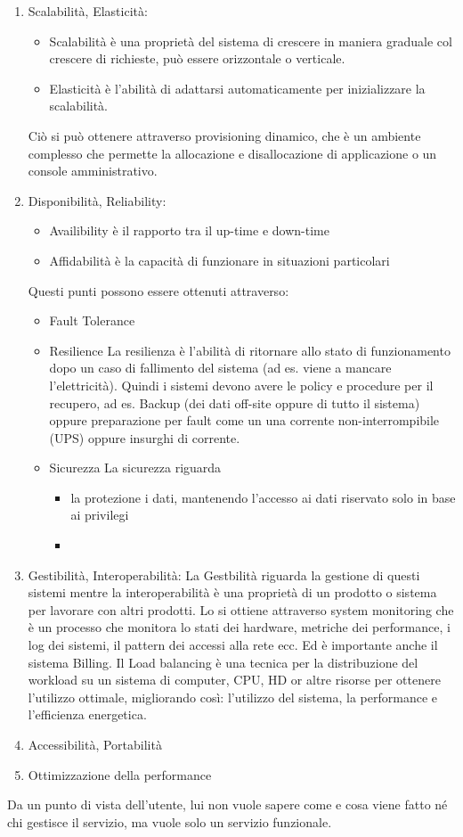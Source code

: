 \documentclass[11pt, twocolumn]{article}
\newenvironment{myitemize}
{ \begin{itemize}
		\setlength{\itemsep}{0pt}
		\setlength{\parskip}{0pt}
		\setlength{\parsep}{0pt}     }
	{ \end{itemize}                  }
\newenvironment{myenumerate}
{ \begin{enumerate}
		\setlength{\itemsep}{0pt}
		\setlength{\parskip}{0pt}
		\setlength{\parsep}{0pt}     }
	{ \end{enumerate}                  }
\begin{document}
\begin{myenumerate}
	\item Scalabilità, Elasticità:
	\begin{myitemize}
		\item Scalabilità è una proprietà del sistema di crescere in maniera graduale col crescere di richieste, può essere orizzontale o verticale.
		\item Elasticità è l'abilità di adattarsi automaticamente per inizializzare la scalabilità.
	\end{myitemize}
	Ciò si può ottenere attraverso provisioning dinamico, che è un ambiente complesso che permette la allocazione e disallocazione di applicazione o un console amministrativo.
	\item Disponibilità, Reliability:
	\begin{myitemize}
		\item Availibility è il rapporto tra il up-time e down-time
		\item Affidabilità è la capacità di funzionare in situazioni particolari
	\end{myitemize}
	Questi punti possono essere ottenuti attraverso:
	\begin{myitemize}
		\item Fault Tolerance
		\item Resilience
		La resilienza è l'abilità di ritornare allo stato di funzionamento dopo un caso di fallimento del sistema (ad es. viene a mancare l'elettricità).
		Quindi i sistemi devono avere le policy e procedure per il recupero, ad es. Backup (dei dati off-site oppure di tutto il sistema) oppure preparazione per fault come un una corrente non-interrompibile (UPS) oppure insurghi di corrente.
		\item Sicurezza
		La sicurezza riguarda 
		\begin{myitemize}
			\item la protezione i dati, mantenendo l'accesso ai dati riservato solo in base ai privilegi
			\item 
		\end{myitemize}
	\end{myitemize}
	\item Gestibilità, Interoperabilità:
	La Gestbilità riguarda la gestione di questi sistemi mentre la interoperabilità è una proprietà di un prodotto o sistema per lavorare con altri prodotti.
	Lo si ottiene attraverso system monitoring che è un processo che monitora lo stati dei hardware, metriche dei performance, i log dei sistemi, il pattern dei accessi alla rete ecc. Ed è importante anche il sistema Billing.
	Il Load balancing è una tecnica per la distribuzione del workload su un sistema di computer, CPU, HD or altre risorse per ottenere l'utilizzo ottimale, migliorando così: l'utilizzo del sistema, la performance e l'efficienza energetica.
	\item Accessibilità, Portabilità
	
	\item Ottimizzazione della performance
\end{myenumerate}
Da un punto di vista dell'utente, lui non vuole sapere come e cosa viene fatto né chi gestisce il servizio, ma vuole solo un servizio funzionale.
\end{document}
